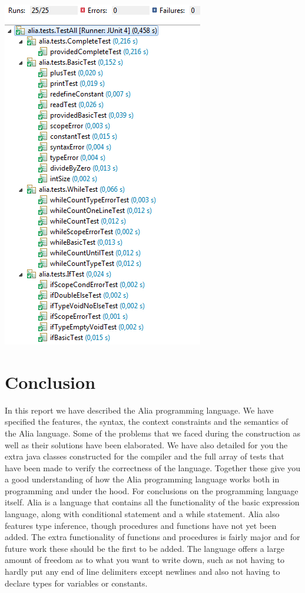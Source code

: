 \documentclass[paper=a4, fontsize=11pt]{article}
\numberwithin{equation}{section}		%
\numberwithin{figure}{section}			%
\numberwithin{table}{section}				%
\begin{document}
\begin{center}
\includegraphics[scale=0.5]{images/testresults.png}
\end{center}



\section{Conclusion}
In this report we have described the Alia programming language. We have specified the features, the syntax, the context constraints and the semantics of the Alia language. Some of the problems that we faced during the construction as well as their solutions have been elaborated. We have also detailed for you the extra java classes constructed for the compiler and the full array of tests that have been made to verify the correctness of the language. Together these give you a good understanding of how the Alia programming language works both in programming and under the hood. For conclusions on the programming language itself. Alia is a language that contains all the functionality of the basic expression language, along with conditional statement and a while statement. Alia also features type inference, though procedures and functions have not yet been added. The extra functionality of functions and procedures is fairly major and for future work these should be the first to be added. The language offers a large amount of freedom as to what you want to write down, such as not having to hardly put any end of line delimiters except newlines and also not having to declare types for variables or constants. 
\end{document}
